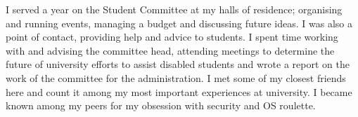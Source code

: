 \documentclass[10pt,a4paper]{moderncv}
\begin{document}
	\small{}
	\small{}
	{I served a year on the Student Committee at my halls of residence; organising and running events, managing a budget and discussing future ideas. I was also a point of contact, providing help and advice to students.}
	{I spent time working with and advising the committee head, attending meetings to determine the future of university efforts to assist disabled students and wrote a report on the work of the committee for the administration.}
	{I met some of my closest friends here and count it among my most important experiences at university. I became known among my peers for my obsession with security and OS roulette.
		\newline{}
	}
	
	{
	}
\end{document}
